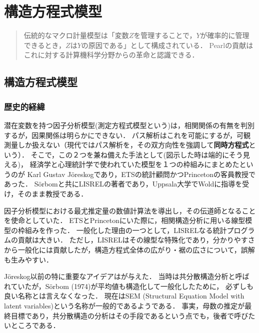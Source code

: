 \documentclass[uplatex,dvipdfmx]{jsreport}
\begin{document}
\chapter{構造方程式模型}

\begin{quotation}
    伝統的なマクロ計量模型は「変数$Z$を管理することで，$Y$が確率的に管理できるとき，$Z$は$Y$の原因である」\cite{Wold-Strotz60}として構成されている．
    Pearlの貢献はこれに対する計算機科学分野からの革命と認識できる．
\end{quotation}

\section{構造方程式模型}

\subsection{歴史的経緯}

\begin{history}
    潜在変数を持つ因子分析模型(測定方程式模型という\cite{豊田秀樹-実践編})は，相関関係の有無を判別するが，因果関係は明らかにできない．
    パス解析はこれを可能にするが，可観測量しか扱えない（現代ではパス解析を，その双方向性を強調して\textbf{同時方程式}という）．
    そこで，この２つを兼ね備えた手法として(図示した時は端的にそう見える)，
    経済学と心理統計学で使われていた模型を１つの枠組みにまとめたというのが
    Karl Gustav Jöreskogであり，ETSの統計顧問かつPrincetonの客員教授であった．
    Sörbomと共にLISRELの著者であり，Uppsala大学でWoldに指導を受け，そのまま教授である．

    因子分析模型における最尤推定量の数値計算法を導出し，その伝道師となることを使命としていた．
    ETSとPrincetonにいた際に，相関構造分析に用いる線型模型の枠組みを作った．
    一般化した理由の一つとして，LISRELなる統計プログラムの貢献は大きい\cite{Grimm-Yarnold}．
    ただし，LISRELはその線型な特殊化であり，分かりやすさから一般化には貢献したが，構造方程式全体の広がり・裾の広さについて，誤解も生みやすい．
\end{history}

\begin{history}[名称の変化]
    Jöreskog以前の特に重要なアイデアは\cite{Bock-Bargmann66}が与えた．
    当時は共分散構造分析と呼ばれていたが，Sörbom (1974)が平均値も構造化して一般化したために，
    必ずしも良い名称とは言えなくなった．
    現在はSEM (Structural Equation Model with latent variables)という名称が一般的であるようである．
    事実，母数の推定が最終目標であり，共分散構造の分析はその手段であるという点でも，後者で呼びたいところである．
\end{history}
\end{document}
